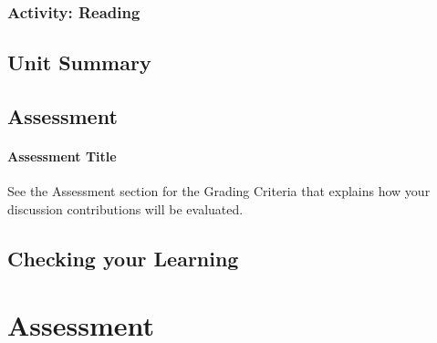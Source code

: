 \documentclass[
]{book}
\begin{document}
\hypertarget{activity-reading-8}{%
\subsection*{Activity: Reading}\label{activity-reading-8}}

\begin{reflect}

\end{reflect}

\hypertarget{unit-summary-8}{%
\section*{Unit Summary}\label{unit-summary-8}}

\hypertarget{assessment-9}{%
\section*{Assessment}\label{assessment-9}}

\begin{assessment}
\hypertarget{assessment-title}{%
\subsubsection*{Assessment Title}\label{assessment-title}}

See the Assessment section for the Grading Criteria that explains how
your discussion contributions will be evaluated.
\end{assessment}

\hypertarget{checking-your-learning-9}{%
\section*{Checking your Learning}\label{checking-your-learning-9}}

\begin{progress}

\end{progress}

\hypertarget{assessment-10}{%
\chapter*{Assessment}\label{assessment-10}}
\end{document}
